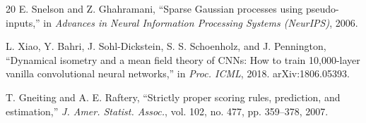 \documentclass[conference]{IEEEtran}
\begin{document}
\begin{thebibliography}{20}
 E. Snelson and Z. Ghahramani, ``Sparse Gaussian processes using pseudo-inputs,'' in \textit{Advances in Neural Information Processing Systems (NeurIPS)}, 2006.

 L. Xiao, Y. Bahri, J. Sohl-Dickstein, S. S. Schoenholz, and J. Pennington, ``Dynamical isometry and a mean field theory of CNNs: How to train 10,000-layer vanilla convolutional neural networks,'' in \textit{Proc. ICML}, 2018. arXiv:1806.05393.

 T. Gneiting and A. E. Raftery, ``Strictly proper scoring rules, prediction, and estimation,'' \textit{J. Amer. Statist. Assoc.}, vol. 102, no. 477, pp. 359--378, 2007.

\end{thebibliography}
\end{document}
